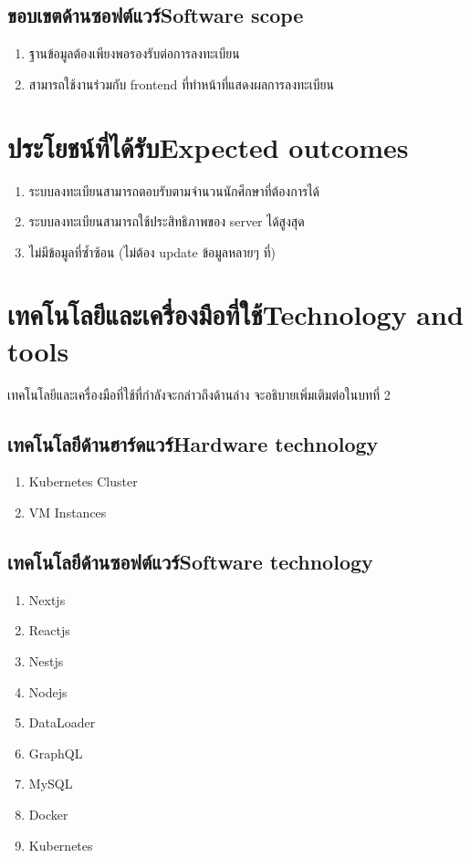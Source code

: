 \subsection{\ifcpe ขอบเขตด้านซอฟต์แวร์\else Software scope\fi}
\begin{enumerate}
    \item ฐานข้อมูลต้องเพียงพอรองรับต่อการลงทะเบียน
    \item สามารถใช้งานร่วมกับ frontend ที่ทำหน้าที่แสดงผลการลงทะเบียน
\end{enumerate}
\section{\ifcpe ประโยชน์ที่ได้รับ\else Expected outcomes\fi}
\begin{enumerate}
    \item ระบบลงทะเบียนสามารถตอบรับตามจำนวนนักศึกษาที่ต้องการได้
    \item ระบบลงทะเบียนสามารถใช้ประสิทธิภาพของ server ได้สูงสุด
    \item ไม่มีข้อมูลที่ซ้ำซ้อน (ไม่ต้อง update ข้อมูลหลายๆ ที่)
\end{enumerate}

\section{\ifcpe เทคโนโลยีและเครื่องมือที่ใช้\else Technology and tools\fi}

เทคโนโลยีและเครื่องมือที่ใช้ที่กำลังจะกล่าวถึงด้านล่าง จะอธิบายเพิ่มเติมต่อในบทที่ 2

\subsection{\ifcpe เทคโนโลยีด้านฮาร์ดแวร์\else Hardware technology\fi}
\begin{enumerate}
    \item Kubernetes Cluster
    \item VM Instances
\end{enumerate}

\subsection{\ifcpe เทคโนโลยีด้านซอฟต์แวร์\else Software technology\fi}
\begin{enumerate}
    \item Nextjs \cite{nextjs}
    \item Reactjs \cite{reactjs}
    \item Nestjs \cite {nestjs}
    \item Nodejs \cite {nodejs}
    \item DataLoader \cite {dataloader}
    \item GraphQL \cite {graphql}
    \item MySQL \cite {mysql}
    \item Docker \cite {docker}
    \item Kubernetes \cite {kubernetes}
\end{enumerate}

